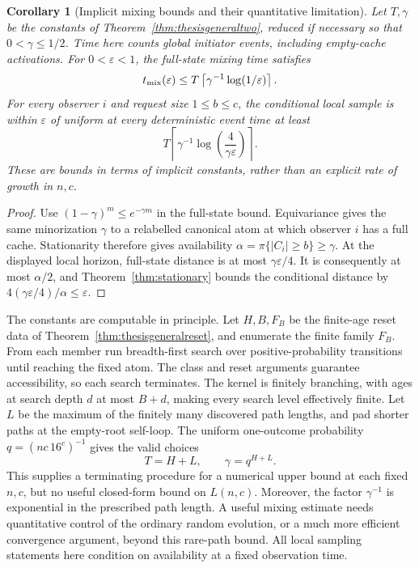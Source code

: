 \documentclass[11pt]{article}
\newtheorem{corollary}[theorem]{Corollary}
\begin{document}
\begin{corollary}[Implicit mixing bounds and their quantitative limitation]
\label{cor:twoimplicitmixing}
Let $T,\gamma$ be the constants of
Theorem~\ref{thm:thesisgeneraltwo}, reduced if necessary so that
$0<\gamma\le1/2$. Time here counts global initiator events,
including empty-cache activations. For $0<\varepsilon<1$,
the full-state mixing time satisfies
\[
 t_{\rm mix}(\varepsilon)
 \le T\left\lceil\gamma^{-1}\log(1/\varepsilon)\right\rceil.
\]
For every observer $i$ and request size $1\le b\le c$,
the conditional local sample is within $\varepsilon$ of uniform
at every deterministic event time at least
\[
 T\left\lceil\gamma^{-1}
            \log\!\left(\frac4{\gamma\varepsilon}\right)\right\rceil.
\]
These are bounds in terms of implicit constants, rather than
an explicit rate of growth in $n,c$.
\end{corollary}
\begin{proof}
Use $(1-\gamma)^m\le e^{-\gamma m}$ in the full-state
bound. Equivariance gives the same minorization $\gamma$
to a relabelled canonical atom at which observer $i$ has
a full cache. Stationarity therefore gives availability
$\alpha=\pi\{|C_i|\ge b\}\ge\gamma$.
At the displayed local horizon, full-state distance is
at most $\gamma\varepsilon/4$. It is consequently
at most $\alpha/2$, and
Theorem~\ref{thm:stationary} bounds the conditional
distance by $4(\gamma\varepsilon/4)/\alpha\le\varepsilon$.
\end{proof}

The constants are computable in principle. Let $H,B,F_B$
be the finite-age reset data of
Theorem~\ref{thm:thesisgeneralreset}, and enumerate the finite
family $F_B$. From each member run breadth-first search over
positive-probability transitions until reaching the fixed atom.
The class and reset arguments guarantee accessibility, so each
search terminates. The kernel is finitely branching, with ages
at search depth $d$ at most $B+d$, making every search level
effectively finite. Let $L$ be the maximum of the finitely
many discovered path lengths, and pad shorter paths at the
empty-root self-loop. The uniform one-outcome probability
$q=(nc\,16^c)^{-1}$ gives the valid choices
\[
 T=H+L,\qquad \gamma=q^{H+L}.
\]
This supplies a terminating procedure for a numerical
upper bound at each fixed $n,c$, but no useful closed-form
bound on $L(n,c)$. Moreover, the factor $\gamma^{-1}$
is exponential in the prescribed path length. A useful
mixing estimate needs quantitative control of the ordinary
random evolution, or a much more efficient convergence
argument, beyond this rare-path bound.
All local sampling statements here condition on availability
at a fixed observation time.
\end{document}
